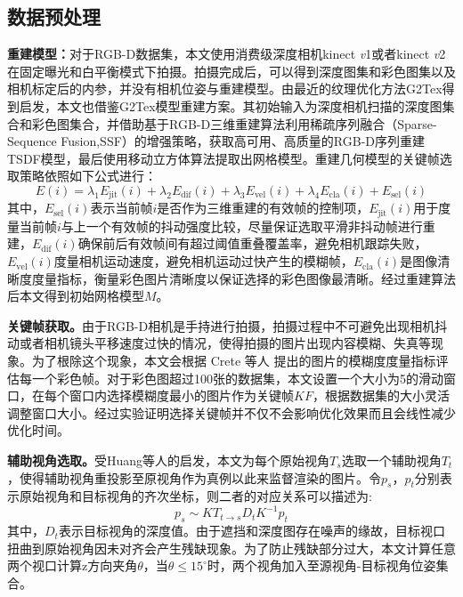 \subsection{数据预处理}
\noindent\textbf{重建模型：}对于RGB-D数据集，本文使用消费级深度相机kinect \emph{v}1或者kinect \emph{v}2在固定曝光和白平衡模式下拍摄。拍摄完成后，可以得到深度图集和彩色图集以及相机标定后的内参，并没有相机位姿与重建模型。由最近的纹理优化方法G2Tex得到启发，本文也借鉴G2Tex模型重建方案。其初始输入为深度相机扫描的深度图集合和彩色图集合，并借助基于RGB-D三维重建算法利用稀疏序列融合（Sparse-Sequence Fusion,SSF）的增强策略，获取高可用、高质量的RGB-D序列重建TSDF模型，最后使用移动立方体算法提取出网格模型。重建几何模型的关键帧选取策略依照如下公式进行：
\begin{equation}
E(i)= \lambda_{1} E_{\mathrm{jit}}(i)+\lambda_{2} E_{\mathrm{dif}}(i)+\lambda_{3} E_{\mathrm{vel}}(i)+\lambda_{4}E_{\mathrm{cla}}(i)+E_{\mathrm{sel}}(i)
\end{equation}
其中，$E_{\mathrm{sel}}(i)$表示当前帧$i$是否作为三维重建的有效帧的控制项，$E_{\mathrm{jit}}(i)$用于度量当前帧$i$与上一个有效帧的抖动强度比较，尽量保证选取平滑非抖动帧进行重建，$E_{\mathrm{dif}}(i)$确保前后有效帧间有超过阈值重叠覆盖率，避免相机跟踪失败，$E_{\mathrm{vel}}(i)$度量相机运动速度，避免相机运动过快产生的模糊帧，$E_{\mathrm{cla}}(i)$是图像清晰度度量指标，衡量彩色图片清晰度以保证选择的彩色图像最清晰。经过重建算法后本文得到初始网格模型$M$。\par
\noindent\textbf{关键帧获取。}由于RGB-D相机是手持进行拍摄，拍摄过程中不可避免出现相机抖动或者相机镜头平移速度过快的情况，使得拍摄的图片出现内容模糊、失真等现象。为了根除这个现象，本文会根据 Crete 等人 提出的图片的模糊度度量指标评估每一个彩色帧。对于彩色图超过100张的数据集，本文设置一个大小为5的滑动窗口，在每个窗口内选择模糊度最小的图片作为关键帧$KF$，根据数据集的大小灵活调整窗口大小。经过实验证明选择关键帧并不仅不会影响优化效果而且会线性减少优化时间。 \par
\noindent\textbf{辅助视角选取。}受Huang等人的启发，本文为每个原始视角$T_s$选取一个辅助视角$T_t$，使得辅助视角重投影至原视角作为真例以此来监督渲染的图片。令$p_s$，$p_t$分别表示原始视角和目标视角的齐次坐标，则二者的对应关系可以描述为:
\begin{equation}
	p_s\sim KT_{t\rightarrow s}D_tK^{-1}p_t \label{work1:wrap}
\end{equation}
其中，$D_t$表示目标视角的深度值。由于遮挡和深度图存在噪声的缘故，目标视口扭曲到原始视角因未对齐会产生残缺现象。为了防止残缺部分过大，本文计算任意两个视口计算z方向夹角$\theta$，当$\theta\le15^{\circ}$时，两个视角加入至源视角-目标视角位姿集合。

